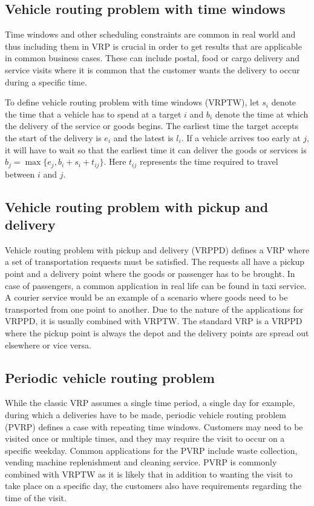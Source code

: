 \subsection{Vehicle routing problem with time windows}

Time windows and other scheduling constraints are common in real world and thus including them in VRP is crucial in order to get results that are applicable in common business cases. These can include postal, food or cargo delivery and service visits where it is common that the customer wants the delivery to occur during a specific time. \cite{cordeau2000vrp}

To define vehicle routing problem with time windows (VRPTW), let $s_i$ denote the time that a vehicle has to spend at a target $i$ and $b_i$ denote the time at which the delivery of the service or goods begins. The earliest time the target accepts the start of the delivery is $e_i$ and the latest is $l_i$. If a vehicle arrives too early at $j$, it will have to wait so that the earliest time it can deliver the goods or services is $b_j = \max\{e_j, b_i + s_i + t_{ij}\}$. Here $t_{ij}$ represents the time required to travel between $i$ and $j$. \cite{solomon1987algorithms}


\subsection{Vehicle routing problem with pickup and delivery}

Vehicle routing problem with pickup and delivery (VRPPD) defines a VRP where a set of transportation requests must be satisfied. The requests all have a pickup point and a delivery point where the goods or passenger has to be brought. In case of passengers, a common application in real life can be found in taxi service. A courier service would be an example of a scenario where goods need to be transported from one point to another. Due to the nature of the applications for VRPPD, it is usually combined with VRPTW. The standard VRP is a VRPPD where the pickup point is always the depot and the delivery points are spread out elsewhere or vice versa. \cite{desaulniers2000vrp}


\subsection{Periodic vehicle routing problem}

While the classic VRP assumes a single time period, a single day for example, during which a deliveries have to be made, periodic vehicle routing problem (PVRP) defines a case with repeating time windows. Customers may need to be visited once or multiple times, and they may require the visit to occur on a specific weekday. \cite{blakeley2003optimizing} Common applications for the PVRP include waste collection, vending machine replenishment and cleaning service. PVRP is commonly combined with VRPTW as it is likely that in addition to wanting the visit to take place on a specific day, the customers also have requirements regarding the time of the visit. \cite{yu2011ant}


